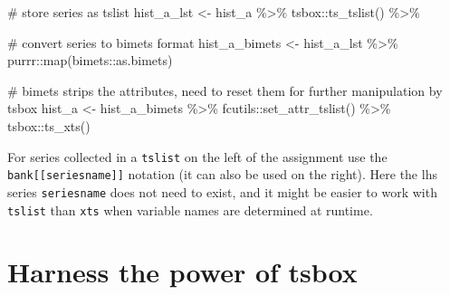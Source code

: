 \documentclass[
  letterpaper,
  DIV=11,
  numbers=noendperiod]{scrreport}
\newenvironment{Shaded}{\begin{snugshade}}{\end{snugshade}}
\newcommand{\CommentTok}[1]{\textcolor[rgb]{0.37,0.37,0.37}{#1}}
\newcommand{\FunctionTok}[1]{\textcolor[rgb]{0.28,0.35,0.67}{#1}}
\newcommand{\NormalTok}[1]{\textcolor[rgb]{0.00,0.23,0.31}{#1}}
\newcommand{\OtherTok}[1]{\textcolor[rgb]{0.00,0.23,0.31}{#1}}
\newcommand{\SpecialCharTok}[1]{\textcolor[rgb]{0.37,0.37,0.37}{#1}}
\newcommand{\StringTok}[1]{\textcolor[rgb]{0.13,0.47,0.30}{#1}}
\begin{document}
\begin{Shaded}
\begin{Highlighting}[]
\CommentTok{\# store series as tslist}
\NormalTok{hist\_a\_lst }\OtherTok{\textless{}{-}}\NormalTok{ hist\_a }\SpecialCharTok{\%\textgreater{}\%} 
\NormalTok{  tsbox}\SpecialCharTok{::}\FunctionTok{ts\_tslist}\NormalTok{() }\SpecialCharTok{\%\textgreater{}\%} 

\CommentTok{\# convert series to bimets format}
\NormalTok{hist\_a\_bimets }\OtherTok{\textless{}{-}}\NormalTok{ hist\_a\_lst }\SpecialCharTok{\%\textgreater{}\%}
\NormalTok{  purrr}\SpecialCharTok{::}\FunctionTok{map}\NormalTok{(bimets}\SpecialCharTok{::}\NormalTok{as.bimets)}

\CommentTok{\# bimets strips the attributes, need to reset them for further manipulation by tsbox}
\NormalTok{hist\_a }\OtherTok{\textless{}{-}}\NormalTok{ hist\_a\_bimets }\SpecialCharTok{\%\textgreater{}\%} 
\NormalTok{  fcutils}\SpecialCharTok{::}\FunctionTok{set\_attr\_tslist}\NormalTok{() }\SpecialCharTok{\%\textgreater{}\%} 
\NormalTok{  tsbox}\SpecialCharTok{::}\FunctionTok{ts\_xts}\NormalTok{()}
\end{Highlighting}
\end{Shaded}

For series collected in a \texttt{tslist} on the left of the assignment
use the \texttt{bank{[}{[}seriesname{]}{]}} notation (it can also be
used on the right). Here the lhs series \texttt{seriesname} does not
need to exist, and it might be easier to work with \texttt{tslist} than
\texttt{xts} when variable names are determined at runtime.

\begin{Shaded}
\end{Shaded}

\section{Harness the power of tsbox}\label{harness-the-power-of-tsbox}
\end{document}

